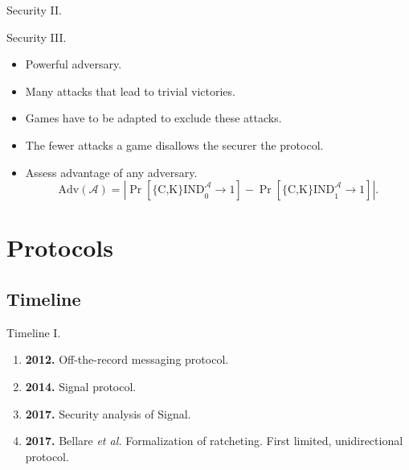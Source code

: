 \documentclass{beamer}
\renewcommand{\t}{\text}
\begin{document}
\begin{frame}{Security II.}
  \begin{figure}[ht]
      \centering
      \setlength{\fboxsep}{10pt}
      \scalebox{0.7}{%
      \fbox{%
        
      }
    }
  \end{figure}

  \begin{figure}[ht]
      \centering
      \setlength{\fboxsep}{10pt}
      \scalebox{0.7}{%
      \fbox{%
        
      }
    }
  \end{figure}
\end{frame}

\begin{frame}{Security III.}
  \begin{itemize}
  \item Powerful adversary.
  \item Many attacks that lead to trivial victories.
  \item Games have to be adapted to exclude these attacks.
  \item The fewer attacks a game disallows the securer the protocol.
  \item Assess advantage of any adversary.
\[
  \t{Adv}(\mathcal{A}) = \left| \Pr \left[ \t{\{C,K\}IND}_0^\mathcal{A} \rightarrow 1 \right] -
                                \Pr \left[ \t{\{C,K\}IND}_1^\mathcal{A} \rightarrow 1 \right]
                         \right|.
\]
  \end{itemize}
\end{frame}

\section{Protocols}
\label{sec:protocols}

\subsection{Timeline}
\label{sec:timeline}

\begin{frame}{Timeline I.}
  \begin{enumerate}
  \item \textbf{2012.} Off-the-record messaging protocol.
  \item \textbf{2014.} Signal protocol.
  \item \textbf{2017.} Security analysis of Signal.
  \item \textbf{2017.} Bellare {\em et al.} Formalization of ratcheting. First
    limited, unidirectional protocol.
  \end{enumerate}
\end{frame}
\end{document}
